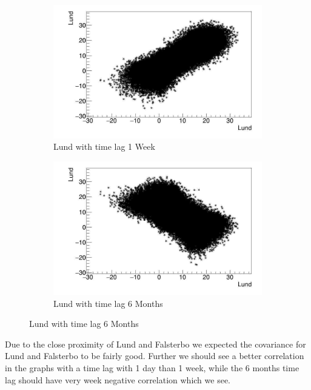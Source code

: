 \begin{figure}[h]
    \begin{subfigure}[b]{0.49\textwidth}
    \centering
    \includegraphics[width=\textwidth]{LU_LU_1W_E.jpg}
        \caption{Lund with time lag 1 Week}
    \end{subfigure}
    \hfill
    \begin{subfigure}[b]{0.49\textwidth}
    \centering
    \includegraphics[width=\textwidth]{LU_LU_6M_E.jpg}
        \caption{Lund with time lag 6 Months}
    \end{subfigure}
\end{figure}

Due to the close proximity of Lund and Falsterbo we expected the covariance for Lund and Falsterbo to be fairly good. Further we should see a better correlation in the graphs with a time lag with 1 day than 1 week, while the 6 months time lag should have very week negative correlation which we see. 

\newpage